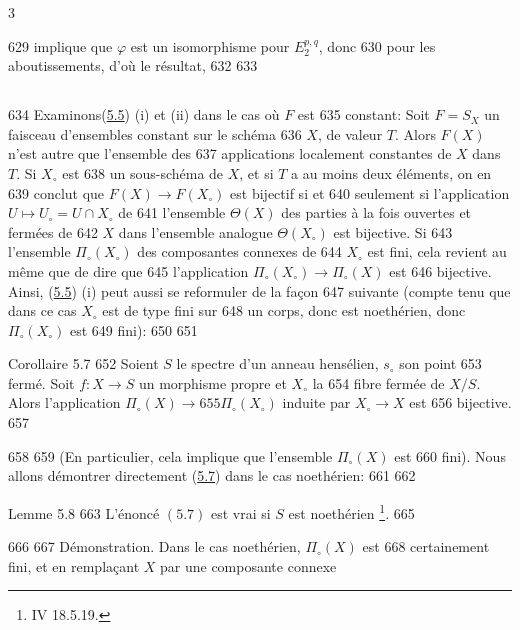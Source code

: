 3	\documentclass[10pt]{../fichiers-configuration-latex/smfart}
\begin{document}
   629	implique que $\varphi$ est un isomorphisme pour $E^{p,q}_2$, donc
   630	pour les aboutissements, d'où le résultat, 	
   632	\setcounter{subsection}{5}
   633	\subsection{}
   634	Examinons\pageoriginale (\hyperref[XII.cor5.5]{5.5}) (i) et (ii) dans le cas où $F$ est
   635	constant: Soit $F=S_X$ un faisceau d'ensembles constant sur le schéma
   636	$X$, de valeur $T$. Alors $F(X)$ n'est autre que l'ensemble des
   637	applications localement constantes de $X$ dans $T$. Si $X_{\circ}$ est
   638	un sous-schéma de $X$, et si $T$ a au moins deux éléments, on en
   639	conclut que $F(X)\rightarrow F(X_{\circ})$ est bijectif si et
   640	seulement si l'application $U\mapsto U_{\circ}=U\cap X_{\circ}$ de
   641	l'ensemble $\Theta(X)$ des parties à la fois ouvertes et fermées de
   642	$X$ dans l'ensemble analogue $\Theta(X_{\circ})$ est bijective. Si
   643	l'ensemble $\Pi_{\circ}(X_{\circ})$ des composantes connexes de
   644	$X_{\circ}$ est fini, cela revient au même que de dire que
   645	l'application $\Pi_{\circ}(X_{\circ})\rightarrow \Pi_{\circ}(X)$ est
   646	bijective. Ainsi, (\hyperref[XII.cor5.5]{5.5}) (i) peut aussi se reformuler de la façon
   647	suivante (compte tenu que dans ce cas $X_{\circ}$ est de type fini sur
   648	un corps, donc est noethérien, donc $\Pi_{\circ}(X_{\circ})$ est
   649	fini):
   650	
   651	\begin{enonce*}{Corollaire 5.7}
   652	Soient $S$ le spectre d'un anneau hensélien, $s_{\circ}$ son point
   653	fermé. Soit $f:X\rightarrow S$ un morphisme propre et $X_{\circ}$ la
   654	fibre fermée de $X/S$. Alors l'application $\Pi_{\circ}(X)\rightarrow
   655	\Pi_{\circ}(X_{\circ})$ induite par $X_{\circ}\rightarrow X$ est
   656	bijective.
   657	\end{enonce*}
   658	
   659	(En particulier, cela implique que l'ensemble $\Pi_{\circ}(X)$ est
   660	fini). Nous allons démontrer directement (\hyperref[XII.cor5.7]{5.7}) dans le cas noethérien:
   661	
   662	\begin{enonce*}{Lemme 5.8}
   663	L'énoncé $(5.7)$ est vrai si $S$ est noethérien \footnote[1]{\Cf {}	  IV 18.5.19.}.
   665	\end{enonce*}
   666	
   667	Démonstration. Dans le cas noethérien, $\Pi_{\circ}(X)$ est
   668	certainement fini, et en remplaçant $X$ par une composante connexe
\end{document}
